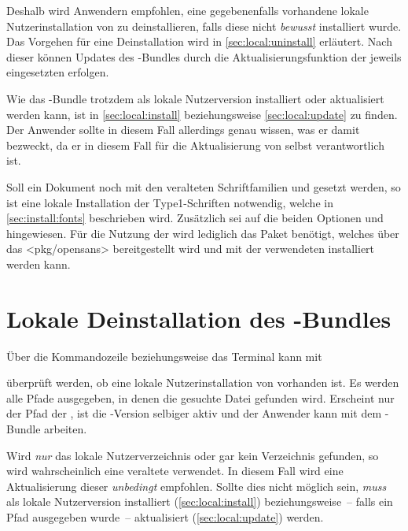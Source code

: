 Deshalb wird Anwendern empfohlen, eine gegebenenfalls vorhandene lokale 
Nutzerinstallation von \TUDScript zu deinstallieren, falls diese nicht 
\emph{bewusst} installiert wurde. Das Vorgehen für eine Deinstallation wird in 
\autoref{sec:local:uninstall} erläutert. Nach dieser können Updates des 
\TUDScript-Bundles durch die Aktualisierungsfunktion der jeweils eingesetzten 
\Distro erfolgen. 

Wie das \TUDScript-Bundle trotzdem als lokale Nutzerversion installiert oder 
aktualisiert werden kann, ist in \autoref{sec:local:install} beziehungsweise 
\autoref{sec:local:update} zu finden. Der Anwender sollte in diesem Fall 
allerdings genau wissen, was er damit bezweckt, da er in diesem Fall für die 
Aktualisierung von \TUDScript selbst verantwortlich ist.



%
Soll ein Dokument noch mit den veralteten Schriftfamilien \Univers und \DIN 
gesetzt werden, so ist eine lokale Installation der Type1-Schriften notwendig, 
welche in \autoref{sec:install:fonts} beschrieben wird. Zusätzlich sei auf die 
beiden Optionen  und  hingewiesen. 
Für die Nutzung der \OpenSans wird lediglich das Paket  
benötigt, welches über das \CTAN<pkg/opensans> bereitgestellt wird und mit der 
verwendeten \Distro installiert werden kann.



\section{%
  Lokale Deinstallation des \TUDScript-Bundles%
  \label{sec:local:uninstall}%
}

Über die Kommandozeile beziehungsweise das Terminal kann mit
%
\begin{quoting}
\RET
\end{quoting}
%
überprüft werden, ob eine lokale Nutzerinstallation von \TUDScript vorhanden 
ist. Es werden alle Pfade ausgegeben, in denen die gesuchte Datei gefunden 
wird. Erscheint nur der Pfad der \Distro, ist die \TUDScript-Version selbiger 
aktiv und der Anwender kann mit dem \TUDScript-Bundle arbeiten.

Wird \emph{nur} das lokale Nutzerverzeichnis oder gar kein Verzeichnis 
gefunden, so wird wahrscheinlich eine veraltete \Distro verwendet. In diesem 
Fall wird eine Aktualisierung dieser \emph{unbedingt} empfohlen. Sollte dies 
nicht möglich sein, \emph{muss} \TUDScript als lokale Nutzerversion installiert 
(\autoref{sec:local:install}) beziehungsweise~-- falls ein Pfad ausgegeben 
wurde~-- aktualisiert (\autoref{sec:local:update}) werden.

